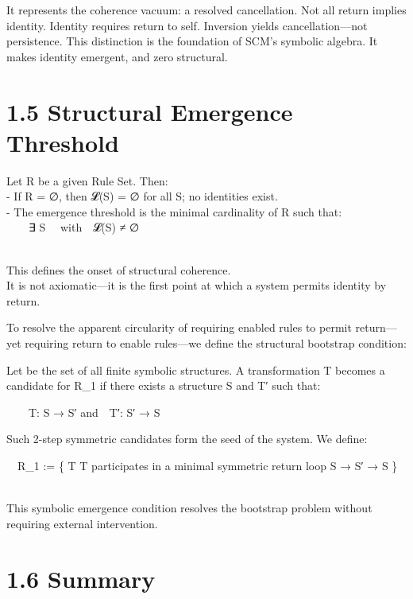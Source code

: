 It represents the coherence vacuum: a resolved cancellation. Not all
return implies identity. Identity requires return to self. Inversion
yields cancellation---not persistence. This distinction is the
foundation of SCM's symbolic algebra. It makes identity emergent, and
zero structural.

\section{1.5 \textbar{} Structural Emergence
Threshold}\label{structural-emergence-threshold}

Let R be a given Rule Set. Then:\\
- If R = ∅, then 𝓛(S) = ∅ for all S; no identities exist.\\
- The emergence threshold is the minimal cardinality of R such that:\\
  ∃ S \in \Sigma* with 𝓛(S) ≠ ∅\\
\strut \\
This defines the onset of structural coherence.\\
It is not axiomatic---it is the first point at which a system permits
identity by return.

To resolve the apparent circularity of requiring enabled rules to permit
return---yet requiring return to enable rules---we define the structural
bootstrap condition:

Let \Sigma* be the set of all finite symbolic structures. A transformation T
\in \Sigma* becomes a candidate for R_1 if there exists a structure S \in \Sigma* and
T′ \in \Sigma* such that:

  T: S → S′ and T′: S′ → S

Such 2-step symmetric candidates form the seed of the system. We define:

 R_1 := \{ T \in \Sigma* \textbar{} T participates in a minimal symmetric return
loop S → S′ → S \}\\
\strut \\
This symbolic emergence condition resolves the bootstrap problem without
requiring external intervention.

\section{1.6 \textbar{} Summary}\label{summary}

